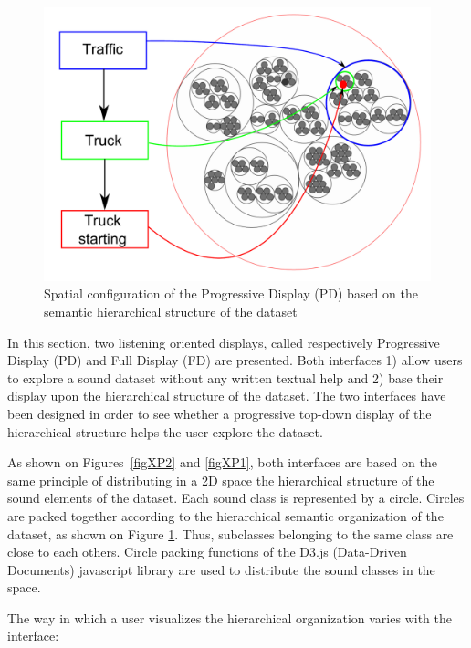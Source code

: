 \documentclass{aes2e}
\begin{document}
\begin{figure}[t]
\begin{center}
\includegraphics[scale=0.24]{gfx/SSF.pdf} 
\end{center}
\caption{\label{figSSF} Spatial configuration of the Progressive Display (PD) based on the semantic hierarchical structure of the dataset}
\end{figure}

In this section, two listening oriented displays, called respectively Progressive Display (PD) and Full Display (FD) are presented. Both interfaces 1) allow users to explore a sound dataset without any written textual help and 2) base their display upon the hierarchical structure of the dataset. The two interfaces have been designed in order to see whether a progressive top-down display of the hierarchical structure helps the user explore the dataset.

As shown on Figures~\ref{figXP2} and \ref{figXP1}, both interfaces are based on the same principle of distributing in a 2D space the hierarchical structure of the  sound elements of the dataset. Each sound class is represented by a circle. Circles are packed together according to the hierarchical semantic organization of the dataset, as shown on Figure \ref{figSSF}. Thus, subclasses belonging to the same class are close to each others. Circle packing functions of the D3.js (Data-Driven Documents) javascript library \cite{2011-d3} are used to distribute the sound classes in the space. 

The way in which a user visualizes the hierarchical organization varies with the interface:
\end{document}
